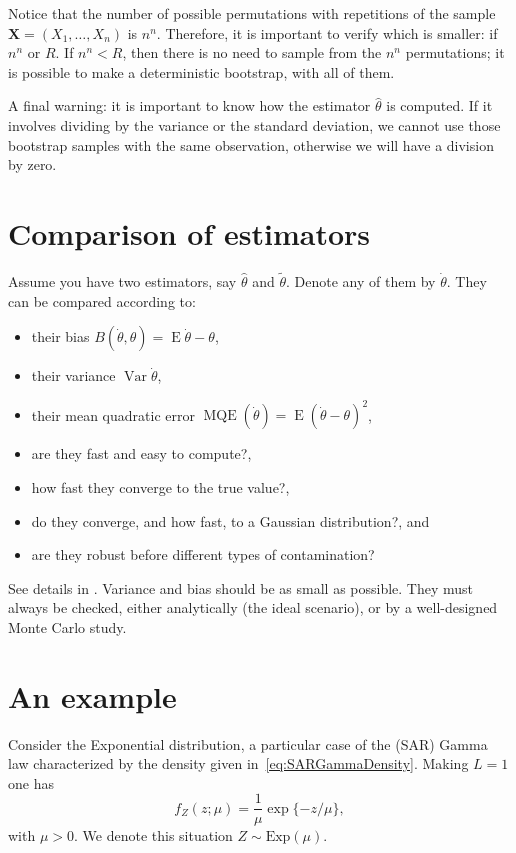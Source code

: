 Notice that the number of possible permutations with repetitions of the sample $\bm X=(X_1,\dots,X_n)$ is $n^n$.
Therefore, it is important to verify which is smaller: if $n^n$ or $R$.
If $n^n < R$, then there is no need to sample from the $n^n$ permutations; it is possible to make a deterministic bootstrap, with all of them.

A final warning: it is important to know how the estimator $\widehat{\theta}$ is computed.
If it involves dividing by the variance or the standard deviation, we cannot use those bootstrap samples with the same observation, otherwise we will have a division by zero.

\section{Comparison of estimators}

Assume you have two estimators, say $\widehat{\theta}$ and $\widetilde{\theta}$.
Denote any of them by $\dot\theta$.
They can be compared according to:
\begin{itemize}
\item their bias $B(\dot{\theta},\theta)=\operatorname{E}\dot\theta-\theta$,
\item their variance $\operatorname{Var}\dot{\theta}$,
\item their mean quadratic error $\operatorname{MQE}(\dot{\theta}) = \operatorname{E}(\dot{\theta}-\theta)^2$,
\item are they fast and easy to compute?,
\item how fast they converge to the true value?,
\item do they converge, and how fast, to a Gaussian distribution?, and
\item are they robust before different types of contamination?
\end{itemize}
See details in \citet{busto92}.
Variance and bias should be as small as possible.
They must always be checked, either analytically (the ideal scenario), or by a well-designed Monte Carlo study.

\section{An example}

Consider the Exponential distribution, a particular case of the (SAR) Gamma law characterized by the density given in~\eqref{eq:SARGammaDensity}.
Making $L=1$ one has
\begin{equation}
f_Z(z;\mu) = \frac{1}{\mu} \exp\{-z/\mu\},
\label{eq:ExpDensity}
\end{equation}
with $\mu>0$.
We denote this situation $Z\sim \text{Exp}(\mu)$.

